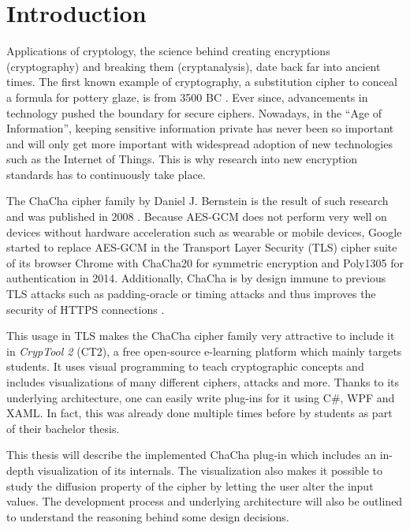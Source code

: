 
\chapter{Introduction}

Applications of cryptology, the science behind creating encryptions (cryptography) and breaking them (cryptanalysis), date back far into ancient times. The first known example of  cryptography, a substitution cipher to conceal a formula for pottery glaze, is from 3500 BC \cite{history}. Ever since, advancements in technology pushed the boundary for secure ciphers. Nowadays, in the \enquote{Age of Information}, keeping sensitive information private has never been so important and will only get more important with widespread adoption of new technologies such as the Internet of Things. This is why research into new encryption standards has to continuously take place.

The ChaCha cipher family by Daniel J. Bernstein is the result of such research and was published in 2008 \cite{chachaspec}. Because AES-GCM does not perform very well on devices without hardware acceleration such as wearable or mobile devices, Google started to replace AES-GCM in the Transport Layer Security (TLS) cipher suite of its browser Chrome with ChaCha20 for symmetric encryption and Poly1305 for authentication in 2014. Additionally, ChaCha is by design immune to previous TLS attacks such as padding-oracle or timing attacks and thus improves the security of HTTPS connections \cite{googlesecurityblog}.

This usage in TLS makes the ChaCha cipher family very attractive to include it in \textit{CrypTool 2} (CT2), a free open-source e-learning platform which mainly targets students. It uses visual programming to teach cryptographic concepts and includes visualizations of many different ciphers, attacks and more. Thanks to its underlying architecture, one can easily write plug-ins for it using C\#, WPF and XAML. In fact, this was already done multiple times before by students as part of their bachelor thesis.

This thesis will describe the implemented ChaCha plug-in which includes an in-depth visualization of its internals. The visualization also makes it possible to study the diffusion property of the cipher by letting the user alter the input values. The development process and underlying architecture will also be outlined to understand the reasoning behind some design decisions.
